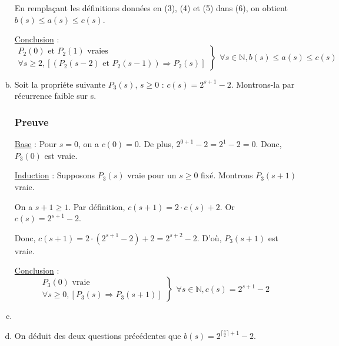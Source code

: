 \documentclass[12pt,a4paper]{article}
\begin{document}
\begin{enumerate}[a)]
En rempla\c{c}ant les d\'efinitions donn\'ees en (3), (4) et (5) dans (6), on obtient
$ b(s) \leq a(s) \leq c(s) $.

\medskip
\underline{Conclusion} : 
\begin{equation*}
\left .\begin{array}{l}
P_{2}(0) \text{ et } P_{2}(1) \text{ vraies } \\
\forall s \geq 2, [(P_{2}(s-2) \text{ et } P_{2}(s-1)) \Rightarrow P_{2}(s) ]
\end{array} \right \}
\left .\begin{array}{l}
\forall s \in \mathbb{N}, b(s) \leq a(s) \leq c(s)
\end{array}\right .
\end{equation*}

\item Soit la propri\'ete suivante \( P_{3}(s) \), $s \geq 0$ : $c(s) = 2^{s+1} - 2$.
Montrons-la par r\'ecurrence faible sur s.

\subsubsection*{Preuve}
\underline{Base} : Pour \( s = 0\), on a $c(0) = 0 $. De plus, $ 2^{0+1} - 2 = 2^1 - 2 = 0$. Donc, $P_{3}(0)$ est vraie.

\medskip
\underline{Induction} : Supposons \( P_{3}(s) \) vraie pour un \( s \geq 0 \) fix\'e. Montrons \( P_{3}(s+1) \) vraie.

On a $ s+1 \geq 1 $. 
Par d\'efinition, $c(s+1) = 2\cdot c(s) + 2$. Or $c(s) = 2^{s+1} - 2$.

Donc, $c(s+1) = 2 \cdot (2^{s+1} - 2) + 2 = 2^{s+2} - 2$. D'o\`u, $P_{3}(s+1)$ est vraie.

\medskip
\underline{Conclusion} : 
\begin{equation*}
\left .\begin{array}{l}
P_{3}(0) \text{ vraie } \\
\forall s \geq 0, [P_{3}(s) \Rightarrow P_{3}(s+1) ]
\end{array} \right \}
\left .\begin{array}{l}
\forall s \in \mathbb{N}, c(s) = 2^{s+1} - 2
\end{array}\right .
\end{equation*}

\item {}

\item On d\'eduit des deux questions pr\'ec\'edentes que $ b(s) = 2^{\lceil \frac{s}{2} \rceil + 1} - 2 $.


\end{enumerate}
\end{document}
